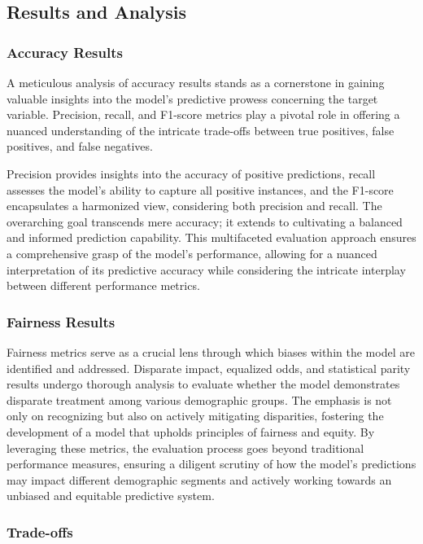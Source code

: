 \documentclass[12pt,a4paper,openright,twoside]{book}
\begin{document}
\subsection{Results and Analysis}

\subsubsection{Accuracy Results}

A meticulous analysis of accuracy results stands as a cornerstone in gaining valuable insights into the model's predictive prowess concerning the target variable. Precision, recall, and F1-score metrics play a pivotal role in offering a nuanced understanding of the intricate trade-offs between true positives, false positives, and false negatives.

Precision provides insights into the accuracy of positive predictions, recall assesses the model's ability to capture all positive instances, and the F1-score encapsulates a harmonized view, considering both precision and recall. The overarching goal transcends mere accuracy; it extends to cultivating a balanced and informed prediction capability. This multifaceted evaluation approach ensures a comprehensive grasp of the model's performance, allowing for a nuanced interpretation of its predictive accuracy while considering the intricate interplay between different performance metrics.

\subsubsection{Fairness Results}

Fairness metrics serve as a crucial lens through which biases within the model are identified and addressed. Disparate impact, equalized odds, and statistical parity results undergo thorough analysis to evaluate whether the model demonstrates disparate treatment among various demographic groups. The emphasis is not only on recognizing but also on actively mitigating disparities, fostering the development of a model that upholds principles of fairness and equity. By leveraging these metrics, the evaluation process goes beyond traditional performance measures, ensuring a diligent scrutiny of how the model's predictions may impact different demographic segments and actively working towards an unbiased and equitable predictive system.

\subsubsection{Trade-offs}
\end{document}
